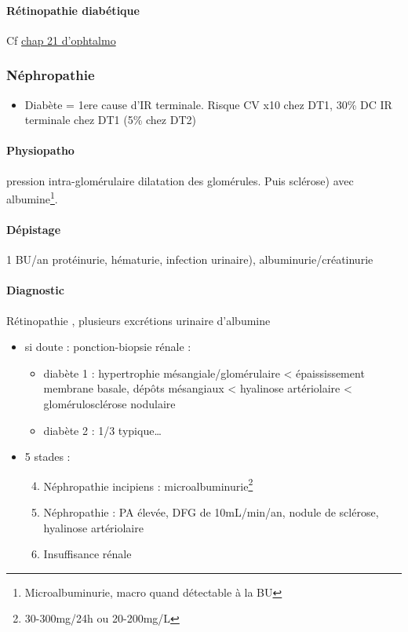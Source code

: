 \documentclass{book}
\begin{document}
\paragraph{Rétinopathie diabétique}
\label{sec:orgc38419f}
Cf \hyperref[orgeb9d2f1]{chap 21 d'ophtalmo}
\subsubsection{Néphropathie}
\label{sec:orgea9ff66}
\begin{itemize}
\item Diabète = 1ere cause d'IR terminale. Risque CV x10 chez DT1, 30\% DC IR terminale
chez DT1 (5\% chez DT2)
\end{itemize}

\paragraph{Physiopatho}
\label{sec:org887a6d7}
\inc pression intra-glomérulaire \thus dilatation des glomérules. Puis sclérose) avec \inc albumine\footnote{Microalbuminurie, macro quand détectable à la BU}.

\paragraph{Dépistage}
\label{sec:org3e29f6c}
1 BU/an protéinurie, hématurie, infection urinaire), albuminurie/créatinurie 
\paragraph{Diagnostic}
\label{sec:org5e93dac}
Rétinopathie , plusieurs excrétions urinaire d'albumine \inc 
\begin{itemize}
\item si doute : ponction-biopsie rénale : 
\begin{itemize}
\item diabète 1 : hypertrophie mésangiale/glomérulaire < épaississement membrane basale, dépôts
mésangiaux < hyalinose artériolaire < glomérulosclérose nodulaire
\item diabète 2 : 1/3 typique\ldots{}
\end{itemize}
\item 5 stades : 
\begin{enumerate}
\setcounter{enumi}{3}
\item Néphropathie incipiens : microalbuminurie\footnote{30-300mg/24h ou 20-200mg/L}
\item Néphropathie : PA élevée, DFG \dec de 10mL/min/an, nodule de sclérose,
hyalinose artériolaire
\item Insuffisance rénale
\end{enumerate}
\end{itemize}
\end{document}
